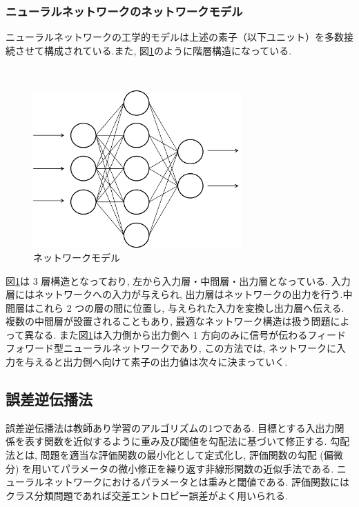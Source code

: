 \subsubsection{ニューラルネットワークのネットワークモデル}

ニューラルネットワークの工学的モデルは上述の素子（以下ユニット）を多数接続させて構成されている.また, 図\ref{fig:network_model}のように階層構造になっている.

\begin{figure}[htbp]
　　\begin{center}
    \includegraphics[clip,width=8.0cm]{./images/NetworkModel.png}
    \caption{ネットワークモデル}
    \label{fig:network_model}
  \end{center}
\end{figure}

図\ref{fig:network_model}は 3 層構造となっており, 左から入力層・中間層・出力層となっている. 入力層にはネットワークへの入力が与えられ, 出力層はネットワークの出力を行う.中間層はこれら 2 つの層の間に位置し, 与えられた入力を変換し出力層へ伝える. 複数の中間層が設置されることもあり, 最適なネットワーク構造は扱う問題によって異なる. また図\ref{fig:network_model}は入力側から出力側へ 1 方向のみに信号が伝わるフィードフォワード型ニューラルネットワークであり, この方法では, ネットワークに入力を与えると出力側へ向けて素子の出力値は次々に決まっていく.

\newpage
\subsection{誤差逆伝播法}

誤差逆伝播法は教師あり学習のアルゴリズムの1つである. 目標とする入出力関係を表す関数を近似するように重み及び閾値を勾配法に基づいて修正する. 勾配法とは, 問題を適当な評価関数の最小化として定式化し, 評価関数の勾配 (偏微分) を用いてパラメータの微小修正を繰り返す非線形関数の近似手法である. ニューラルネットワークにおけるパラメータとは重みと閾値である. 評価関数にはクラス分類問題であれば交差エントロピー誤差がよく用いられる.

